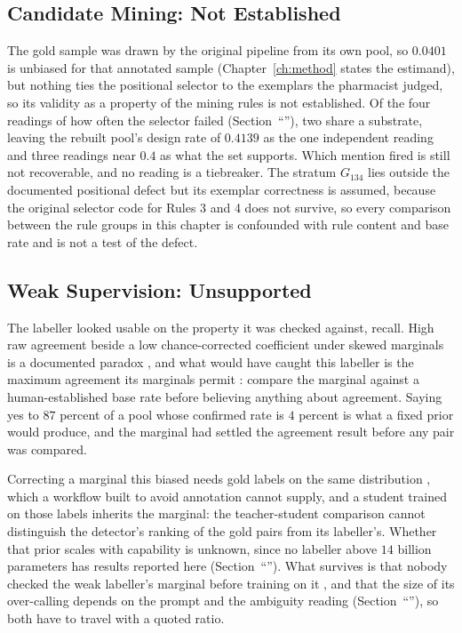 \subsection{Candidate Mining: Not Established}

The gold sample was drawn by the original pipeline from its own pool, so $0.0401$ is unbiased for
that annotated sample (Chapter~\ref{ch:method} states the estimand), but nothing ties the
positional selector to the exemplars the pharmacist judged, so its validity as a property of the
mining rules is not established. Of the four readings of how often the selector failed
(Section~``''), two share a substrate, leaving the rebuilt pool's design
rate of $0.4139$ as the one independent reading and three readings near $0.4$ as what the set
supports. Which mention fired is still not recoverable, and no reading is a tiebreaker. The stratum $G_{134}$ lies outside the documented positional defect but its
exemplar correctness is assumed, because the original selector code for Rules 3 and
4 does not survive, so every comparison between the rule groups in this chapter is
confounded with rule content and base rate and is not a test of the defect.

\subsection{Weak Supervision: Unsupported}

The labeller looked usable on the property it was checked against, recall. High raw
agreement beside a low chance-corrected coefficient under skewed marginals is a documented
paradox \citep{feinstein1990paradoxes,cicchetti1990resolving}, and what would have caught this
labeller is the maximum agreement its marginals permit \citep{cohen1960kappa}: compare the
marginal against a human-established base rate before believing anything about agreement. Saying yes to $87$ percent of a pool whose confirmed rate is $4$ percent is what a fixed
prior would produce, and the marginal had settled the agreement result before any pair was
compared.

Correcting a marginal this biased needs gold labels on the same distribution
\citep{forman2008quantifying,egami2023surrogates}, which a workflow built to avoid annotation
\citep{ratner2016dataprogramming,ratner2017snorkel,zhang2022wssurvey} cannot supply, and a student
trained on those labels inherits the marginal: the teacher-student comparison cannot distinguish
the detector's ranking of the gold pairs from its labeller's. Whether that prior scales with
capability is unknown, since no labeller above $14$ billion parameters has results reported here
(Section~``''). What survives is that nobody checked the weak labeller's
marginal before training on it \citep{pangakis2023validation}, and that the size of its
over-calling depends on the prompt and the ambiguity reading
(Section~``''), so both have to travel with a quoted ratio.

